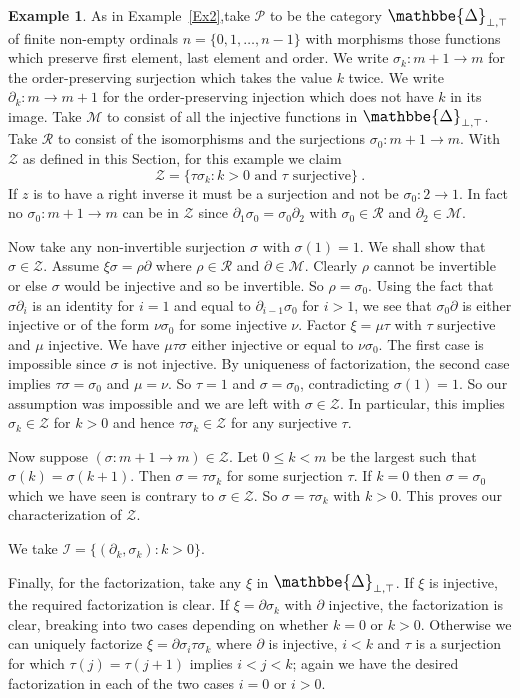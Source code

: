 \documentclass[a4paper,12pt,reqno]{amsart}
\def\makebigger#1#2#3{\hbox{#1$\mathsurround=0pt #2{#3}$}}
\def\bigger#1#2{{\relax\mathpalette{\makebigger#1}{#2}}}
\newcommand{\DelCat}{{\bigger\large{\mathbbe{\Delta}}}}
\theoremstyle{definition}
\newtheorem{example}[theorem]{Example}
\theoremstyle{fact}
\theoremstyle{genquest}
\theoremstyle{step}
\newcommand{\lra}{\longrightarrow}
\newcommand{\ra}{\rightarrow}
\def\CI{{\mathscr I}}
\def\CM{{\mathscr M}}
\def\CP{{\mathscr P}}
\def\CR{{\mathscr R}}
\def\CZ{{\mathscr Z}}
\begin{document}
\begin{example}\label{Ex2+}
As in Example~\ref{Ex2},take $\CP$ to be the category $\DelCat_{\bot,\top}$ of finite
non-empty ordinals $n = \{0,1,\dots,n-1\}$ with morphisms those functions which preserve
first element, last element and order.
We write $\sigma_k : m+1 \ra m$ for the order-preserving surjection which takes the value $k$ twice.
We write $\partial_k : m \ra m+1$ for the order-preserving injection which does not have $k$ in its image.
Take $\CM$ to consist of all the injective functions in $\DelCat_{\bot,\top}$. 
Take $\CR$ to consist of the isomorphisms and the surjections $\sigma_0 : m+1 \lra m$.
With $\CZ$ as defined in this Section, for this example we claim
$$\CZ = \{\tau \sigma_k : k > 0 \text{ and } \tau \text{ surjective} \} \ . $$
If $z$ is to have a right inverse it must be a surjection and not be $\sigma_0 : 2\ra 1$.
In fact no $\sigma_0 : m+1\ra m$ can be in $\CZ$ since $\partial_1 \sigma_0 = \sigma_0 \partial_2$
with $\sigma_0\in \CR$ and $\partial_2 \in \CM$. 

Now take any non-invertible surjection $\sigma$ with $\sigma(1) =1$.
We shall show that $\sigma \in \CZ$. Assume $\xi \sigma = \rho \partial$
where $\rho \in \CR$ and $\partial \in \CM$. Clearly $\rho$ cannot be
invertible or else $\sigma$ would be injective and so be invertible.
So $\rho = \sigma_0$. Using the fact that $\sigma \partial_i$ is an
identity for $i = 1$ and equal to $\partial_{i-1} \sigma_0$ for $i>1$,
we see that $\sigma_0 \partial$ is either injective or of the form
$\nu \sigma_0$ for some injective $\nu$. 
Factor $\xi = \mu \tau$ with $\tau$ surjective and $\mu$ injective. 
We have $\mu \tau \sigma$ either injective or equal to $\nu \sigma_0$.
The first case is impossible since $\sigma$ is not injective. By uniqueness
of factorization, the second case implies $\tau \sigma = \sigma_0$
and $\mu = \nu$. So $\tau = 1$ and $\sigma = \sigma_0$,
contradicting $\sigma(1) = 1$. So our assumption was impossible and
we are left with $\sigma \in \CZ$. In particular, this implies 
$\sigma_k \in \CZ$ for $k>0$ and hence $\tau \sigma_k \in \CZ$
for any surjective $\tau$.

Now suppose $(\sigma : m+1 \ra m) \in \CZ$. Let $0\le k < m$ be the largest 
such that $\sigma(k)=\sigma(k+1)$. Then $\sigma = \tau \sigma_k$ for some
surjection $\tau$. If $k=0$ then $\sigma = \sigma_0$ which we have seen is 
contrary to $\sigma \in \CZ$. So $\sigma = \tau \sigma_k$ with $k>0$.
This proves our characterization of $\CZ$.

We take $\CI = \{(\partial_k,\sigma_k) : k>0 \}$.
 
 Finally, for the factorization, take any $\xi$ in $\DelCat_{\bot,\top}$.
 If $\xi$ is injective, the required factorization is clear. 
 If $\xi = \partial \sigma_k$ with $\partial$ injective, the factorization is clear,
 breaking into two cases depending on whether $k=0$ or $k>0$.  
 Otherwise we can uniquely factorize $\xi = \partial \sigma_i \tau \sigma_k$ where
 $\partial$ is injective, $i<k$ and $\tau$ is a surjection for which $\tau(j)=\tau(j+1)$ implies $i<j<k$;
 again we have the desired factorization in each of the two cases $i=0$ or $i>0$.
 \end{example}
\end{document}
